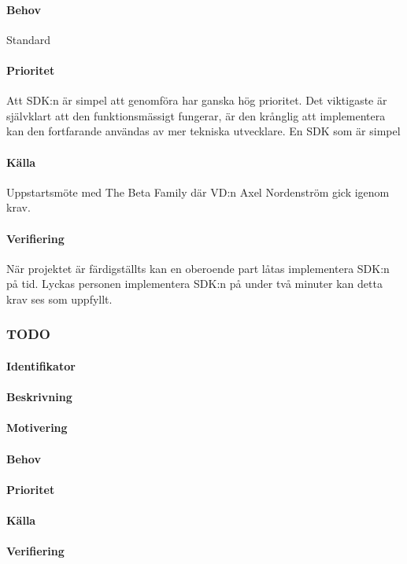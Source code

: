 \paragraph{Behov}
Standard
\paragraph{Prioritet}
Att SDK:n är simpel att genomföra har ganska hög prioritet. Det viktigaste är självklart att den funktionsmässigt fungerar, är den krånglig att implementera kan den fortfarande användas av mer tekniska utvecklare. En SDK som är simpel 
\paragraph{Källa}
Uppstartsmöte med The Beta Family där VD:n Axel Nordenström gick igenom krav.
\paragraph{Verifiering}
När projektet är färdigställts kan en oberoende part låtas implementera SDK:n på tid. Lyckas personen implementera SDK:n på under två minuter kan detta krav ses som uppfyllt.

\subsubsection{TODO}
\paragraph{Identifikator} 
\paragraph{Beskrivning}
\paragraph{Motivering}
\paragraph{Behov}
\paragraph{Prioritet}
\paragraph{Källa}
\paragraph{Verifiering}

